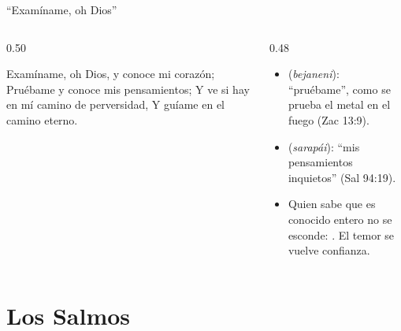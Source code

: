 \begin{frame}{``Examíname, oh Dios''}
\begin{columns}[c,onlytextwidth]
\begin{column}{0.50\textwidth}
\begin{cita}Examíname, oh Dios, y conoce mi corazón; Pruébame y conoce mis pensamientos; Y ve si hay en mí camino de perversidad, Y guíame en el camino eterno.\end{cita}
\begin{center}\end{center}
\end{column}
\begin{column}{0.48\textwidth}\small
\begin{itemize}
\item {} (\emph{bejaneni}): ``pruébame'', como se prueba el metal en el fuego (Zac 13:9).
\item {} (\emph{sarapái}): ``mis pensamientos inquietos'' (Sal 94:19).
\item Quien sabe que es conocido entero no se esconde: . El temor se vuelve confianza.
\end{itemize}
\end{column}
\end{columns}
\end{frame}

\section{Los Salmos}

